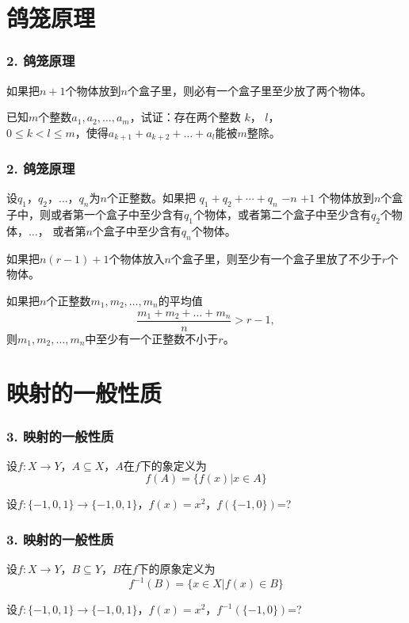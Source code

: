 \documentclass{beamer}
\begin{document}
\begin{CJK*}{UTF8}{gbsn}
\section{鸽笼原理}
\begin{frame}
  \frametitle{2. 鸽笼原理}
  \begin{Thm}[鸽笼原理]
    如果把$n+1$个物体放到$n$个盒子里，则必有一个盒子里至少放了两个物体。
  \end{Thm}
  \pause
  \begin{Ex}
    已知$m$个整数$a_1,a_2,\ldots,a_m$，试证：存在两个整数 $k$， $l$， \\ $0\leq k < l \leq m$，使得$a_{k+1}+a_{k+2}+\ldots+a_{l}$能被$m$整除。
  \end{Ex}
\end{frame}

\begin{frame}
  \frametitle{2. 鸽笼原理}
  \begin{Thm}[鸽笼原理的强形式]
    设$q_1$，$q_2$，$\ldots$，$q_n$为$n$个正整数。如果把 $q_1 + q_2 + \cdots + q_n$  $- n$ $ + 1$ 个物体放到$n$个盒子中，则或者第一个盒子中至少含有$q_1$个物体，或者第二个盒子中至少含有$q_2$个物体，$\ldots$，
    或者第$n$个盒子中至少含有$q_n$个物体。
  \end{Thm}\pause
  \begin{Cor}
    如果把$n(r-1) + 1$个物体放入$n$个盒子里，则至少有一个盒子里放了不少于$r$个物体。
  \end{Cor}\pause
  \begin{Cor}
    如果把$n$个正整数$m_1, m_2, \ldots, m_n$的平均值\[\frac{m_1 + m_2 + \ldots + m_n}{n} > r - 1,\] 则$m_1, m_2, \ldots, m_n$中至少有一个正整数不小于$r$。
  \end{Cor}
\end{frame}
\section{映射的一般性质}
\begin{frame}
  \frametitle{3. 映射的一般性质}
  \begin{Def}
    设$f:X\to Y$，$A \subseteq X$，$A$在$f$下的\alert{象}定义为\[f(A)=\{f(x)|x\in A\}\]
  \end{Def}\pause
  \begin{Ex}
    设$f:\{-1,0,1\}\to \{-1,0,1\}$，$f(x)=x^2$，$f(\{-1,0\})$=?
  \end{Ex}
\end{frame}
\begin{frame}
  \frametitle{3. 映射的一般性质}
  \begin{Def}
    设$f:X\to Y$，$B \subseteq Y$，$B$在$f$下的\alert{原象}定义为\[f^{-1}(B)=\{x\in X|f(x)\in B\}\]
  \end{Def}\pause
  \begin{Ex}
    设$f:\{-1,0,1\}\to \{-1,0,1\}$，$f(x)=x^2$，$f^{-1}(\{-1,0\})$=?
  \end{Ex}
\end{frame}


\end{CJK*}
\end{document}
